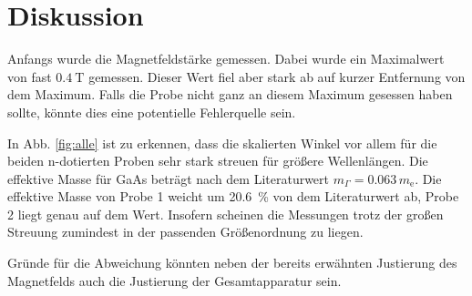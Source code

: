 \section{Diskussion}
\label{sec:Diskussion}

Anfangs wurde die Magnetfeldstärke gemessen. Dabei wurde ein Maximalwert von fast $\SI{0.4}{\tesla}$ gemessen. Dieser Wert fiel aber stark ab auf kurzer Entfernung von dem Maximum. Falls die Probe nicht ganz an diesem Maximum gesessen haben sollte, könnte dies eine potentielle Fehlerquelle sein. 

In Abb. \ref{fig:alle} ist zu erkennen, dass die skalierten Winkel vor allem für die beiden n-dotierten Proben sehr stark streuen für größere Wellenlängen. 
Die effektive Masse für GaAs beträgt nach dem Literaturwert $m_{\Gamma} = \num{0.063} \, m_\text{e}$. 
Die effektive Masse von Probe 1 weicht um \SI{20.6}{\percent} von dem Literaturwert ab, Probe 2 liegt genau auf dem Wert. 
Insofern scheinen die Messungen trotz der großen Streuung zumindest in der passenden Größenordnung zu liegen. 

Gründe für die Abweichung könnten neben der bereits erwähnten Justierung des Magnetfelds auch die Justierung der Gesamtapparatur sein.


